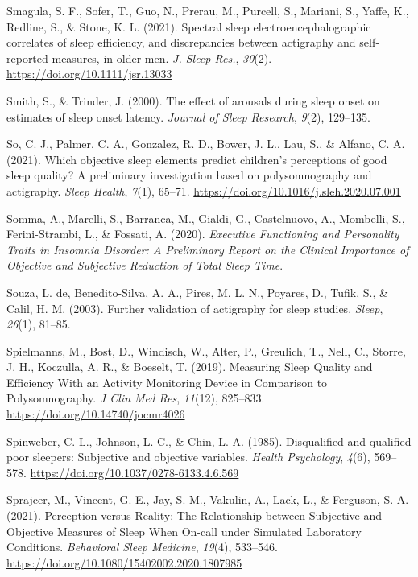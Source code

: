 \documentclass[
]{article}
\newlength{\cslhangindent}
\newenvironment{CSLReferences}[2] %
 {\begin{list}{}{%
  \setlength{\itemindent}{0pt}
  \setlength{\leftmargin}{0pt}
  \setlength{\parsep}{0pt}
  \ifodd #1
   \setlength{\leftmargin}{\cslhangindent}
   \setlength{\itemindent}{-1\cslhangindent}
  \fi
  \setlength{\itemsep}{#2\baselineskip}}}
 {\end{list}}
\begin{document}
\begin{CSLReferences}{1}{0}
Smagula, S. F., Sofer, T., Guo, N., Prerau, M., Purcell, S., Mariani, S., Yaffe, K., Redline, S., \& Stone, K. L. (2021). Spectral sleep electroencephalographic correlates of sleep efficiency, and discrepancies between actigraphy and self‐reported measures, in older men. \emph{J. Sleep Res.}, \emph{30}(2). \url{https://doi.org/10.1111/jsr.13033}

Smith, S., \& Trinder, J. (2000). The effect of arousals during sleep onset on estimates of sleep onset latency. \emph{Journal of Sleep Research}, \emph{9}(2), 129--135.

So, C. J., Palmer, C. A., Gonzalez, R. D., Bower, J. L., Lau, S., \& Alfano, C. A. (2021). Which objective sleep elements predict children's perceptions of good sleep quality? {A} preliminary investigation based on polysomnography and actigraphy. \emph{Sleep Health}, \emph{7}(1), 65--71. \url{https://doi.org/10.1016/j.sleh.2020.07.001}

Somma, A., Marelli, S., Barranca, M., Gialdi, G., Castelnuovo, A., Mombelli, S., Ferini-Strambi, L., \& Fossati, A. (2020). \emph{Executive {Functioning} and {Personality} {Traits} in {Insomnia} {Disorder}: {A} {Preliminary} {Report} on the {Clinical} {Importance} of {Objective} and {Subjective} {Reduction} of {Total} {Sleep} {Time}}.

Souza, L. de, Benedito-Silva, A. A., Pires, M. L. N., Poyares, D., Tufik, S., \& Calil, H. M. (2003). Further validation of actigraphy for sleep studies. \emph{Sleep}, \emph{26}(1), 81--85.

Spielmanns, M., Bost, D., Windisch, W., Alter, P., Greulich, T., Nell, C., Storre, J. H., Koczulla, A. R., \& Boeselt, T. (2019). Measuring {Sleep} {Quality} and {Efficiency} {With} an {Activity} {Monitoring} {Device} in {Comparison} to {Polysomnography}. \emph{J Clin Med Res}, \emph{11}(12), 825--833. \url{https://doi.org/10.14740/jocmr4026}

Spinweber, C. L., Johnson, L. C., \& Chin, L. A. (1985). Disqualified and qualified poor sleepers: {Subjective} and objective variables. \emph{Health Psychology}, \emph{4}(6), 569--578. \url{https://doi.org/10.1037/0278-6133.4.6.569}

Sprajcer, M., Vincent, G. E., Jay, S. M., Vakulin, A., Lack, L., \& Ferguson, S. A. (2021). Perception versus {Reality}: {The} {Relationship} between {Subjective} and {Objective} {Measures} of {Sleep} {When} {On}-call under {Simulated} {Laboratory} {Conditions}. \emph{Behavioral Sleep Medicine}, \emph{19}(4), 533--546. \url{https://doi.org/10.1080/15402002.2020.1807985}


\end{CSLReferences}
\end{document}
